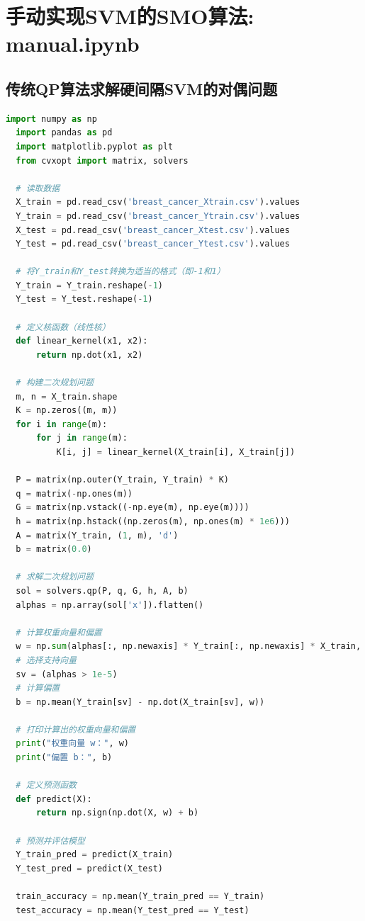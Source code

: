 \documentclass[12pt]{article}
\begin{document}
\section{手动实现SVM的SMO算法: manual.ipynb}
\subsection{传统QP算法求解硬间隔SVM的对偶问题}
\begin{lstlisting}[language=Python]
  import numpy as np
  import pandas as pd
  import matplotlib.pyplot as plt
  from cvxopt import matrix, solvers
  
  # 读取数据
  X_train = pd.read_csv('breast_cancer_Xtrain.csv').values
  Y_train = pd.read_csv('breast_cancer_Ytrain.csv').values
  X_test = pd.read_csv('breast_cancer_Xtest.csv').values
  Y_test = pd.read_csv('breast_cancer_Ytest.csv').values
  
  # 将Y_train和Y_test转换为适当的格式（即-1和1）
  Y_train = Y_train.reshape(-1)
  Y_test = Y_test.reshape(-1)
  
  # 定义核函数（线性核）
  def linear_kernel(x1, x2):
      return np.dot(x1, x2)
  
  # 构建二次规划问题
  m, n = X_train.shape
  K = np.zeros((m, m))
  for i in range(m):
      for j in range(m):
          K[i, j] = linear_kernel(X_train[i], X_train[j])
  
  P = matrix(np.outer(Y_train, Y_train) * K)
  q = matrix(-np.ones(m))
  G = matrix(np.vstack((-np.eye(m), np.eye(m))))
  h = matrix(np.hstack((np.zeros(m), np.ones(m) * 1e6)))
  A = matrix(Y_train, (1, m), 'd')
  b = matrix(0.0)
  
  # 求解二次规划问题
  sol = solvers.qp(P, q, G, h, A, b)
  alphas = np.array(sol['x']).flatten()
  
  # 计算权重向量和偏置
  w = np.sum(alphas[:, np.newaxis] * Y_train[:, np.newaxis] * X_train, axis=0)
  # 选择支持向量
  sv = (alphas > 1e-5)
  # 计算偏置
  b = np.mean(Y_train[sv] - np.dot(X_train[sv], w))
  
  # 打印计算出的权重向量和偏置
  print("权重向量 w：", w)
  print("偏置 b：", b)
  
  # 定义预测函数
  def predict(X):
      return np.sign(np.dot(X, w) + b)
  
  # 预测并评估模型
  Y_train_pred = predict(X_train)
  Y_test_pred = predict(X_test)
  
  train_accuracy = np.mean(Y_train_pred == Y_train)
  test_accuracy = np.mean(Y_test_pred == Y_test)
  

\end{lstlisting}
\end{document}
